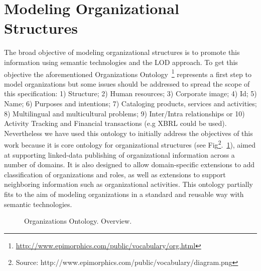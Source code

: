 \documentclass{llncs}
\begin{document}
\section{Modeling Organizational Structures}
The broad objective of modeling organizational structures is to promote this information 
using semantic technologies and the LOD approach. To get this objective 
the aforementioned Organizations Ontology~\footnote{\url{http://www.epimorphics.com/public/vocabulary/org.html}} represents a 
first step to model organizations but some issues should be addressed to spread the scope of this specification: 
1) Structure; 2) Human resources; 3) Corporate image; 4) Id; 5) Name; 6) Purposes and intentions; 7) Cataloging products, services and activities;
 8) Multilingual and multicultural problems; 9) Inter/Intra relationships or 10) Activity Tracking and Financial transactions 
(e.g XBRL could be used). Nevertheless we have used this ontology to initially address the objectives of this work because 
it is core ontology for organizational structures (see Fig\footnote{Source: http://www.epimorphics.com/public/vocabulary/diagram.png}.~\ref{fig:org}), 
aimed at supporting linked-data publishing of organizational information across a number of domains. It is also designed 
to allow domain-specific extensions to add classification of organizations and roles, 
as well as extensions to support neighboring information such as organizational activities. 
This ontology partially fits to the aim of modeling organizations in a standard and reusable way 
with semantic technologies. 

\begin{figure}[h]
 \centering
    \caption{Organizations Ontology. Overview.}
 \label{fig:org}
\end{figure}
\end{document}
